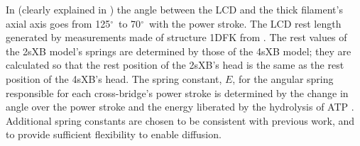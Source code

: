 \documentclass[10pt]{article}
\newcommand{\citep}[1]{\cite{#1}} %
\newcommand{\citet}[1]{\cite{#1}}
\newcommand{\de}{$^\circ$~} %
\begin{document}
\begin{table}[ht]
\begin{center}
{	    In \citet{Taylor1999} (clearly explained in \citet{Davis2009}) the angle between the LCD and the thick filament's axial axis goes from 125\de to 70\de with the power stroke. 
	    The LCD rest length generated by measurements made of structure 1DFK from \citet{Houdusse2000}. 
	    The rest values of the 2sXB model's springs are determined by those of the 4sXB model; they are calculated so that the rest position of the 2sXB's head is the same as the rest position of the 4sXB's head. 
	    The spring constant, $E$, for the angular spring responsible for each cross-bridge's power stroke is determined by the change in angle over the power stroke and the energy liberated by the hydrolysis of ATP \citep{Tanner2007}. 
	    Additional spring constants are chosen to be consistent with previous work, and to provide sufficient flexibility to enable diffusion. 
    }
    \end{center}
\end{table}

\end{document}
